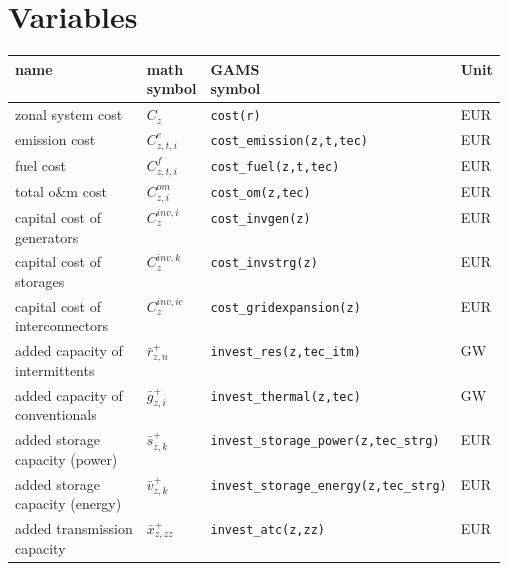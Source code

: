 \documentclass[11pt,a4paper]{article}
\begin{document}
\section{Variables} \label{variables}
\begin{tabular}{l l l l}
\textbf{name} & \makecell[l]{\textbf{math} \\ \textbf{symbol}} & \makecell[l]{\textbf{GAMS} \\\textbf{symbol}} & \textbf{Unit} \\
\hline \hline
zonal system cost & $C_{z}$ & \texttt{cost(r)} & EUR \\ \hline
emission cost & $C^{e}_{z,t,i}$ & \texttt{cost\_emission(z,t,tec)} & EUR \\ \hline
fuel cost & $C^{f}_{z,t,i}$ & \texttt{cost\_fuel(z,t,tec)} & EUR \\ \hline
total o\&m cost & $C^{om}_{z,i}$ & \texttt{cost\_om(z,tec)} & EUR \\ \hline
\makecell[l]{capital cost of \\generators} & $C_{z}^{inv,i}$ & \texttt{cost\_invgen(z)} & EUR \\ \hline
\makecell[l]{capital cost of \\storages} & $C_{z}^{inv,k}$ & \texttt{cost\_invstrg(z)} & EUR \\ \hline
\makecell[l]{capital cost of \\interconnectors} & $C_{z}^{inv,ic}$ & \texttt{cost\_gridexpansion(z)} & EUR \\ \hline
\makecell[l]{added capacity of \\intermittents} & $\bar{r}^{+}_{z,n}$ & \texttt{invest\_res(z,tec\_itm)} & GW \\ \hline
\makecell[l]{added capacity of \\conventionals} & $\bar{g}^{+}_{z,i}$ & \texttt{invest\_thermal(z,tec)} & GW \\ \hline
\makecell[l]{added storage \\capacity (power)} & $\bar{s}^{+}_{z,k}$ & \texttt{invest\_storage\_power(z,tec\_strg)} & EUR \\ \hline
\makecell[l]{added storage \\capacity (energy)} & $\bar{v}^{+}_{z,k}$ & \texttt{invest\_storage\_energy(z,tec\_strg)} & EUR \\ \hline
\makecell[l]{added transmission \\capacity} & $\bar{x}^{+}_{z,zz}$ & \texttt{invest\_atc(z,zz)} & EUR \\ \hline

\end{tabular}
\end{document}
